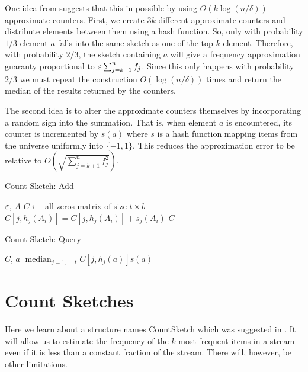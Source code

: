 One idea from \cite{Charikar02findingfrequent} suggests that this in possible by using $O(k \log(n/\delta))$ approximate counters.
First, we create $3k$ different approximate counters and distribute elements between them using a hash function.
So, only with probability $1/3$ element $a$ falls into the same sketch as one of the top $k$ element.
Therefore, with probability $2/3$, the sketch containing  $a$ will give a frequency  approximation guaranty proportional to $\varepsilon \sum_{j=k+1}^{n}f_j$. Since this only happens with probability $2/3$ we must repeat the construction $O(\log(n/\delta))$ times and return the median
of the results returned by the counters.

The second idea is to alter the approximate counters themselves by incorporating a random sign into the summation.
That is, when element $a$ is encountered, its counter is incremented by $s(a)$ where $s$
is a hash function mapping items from the universe uniformly into $\{-1,1\}$.
This reduces the approximation error to be relative to $O(\sqrt{\sum_{j=k+1}^{n}f^2_j})$.

\begin{algorithm}
\caption{Count Sketch: Add}
\label{alg:CountSketchAdd}
\begin{algorithmic}
 $\varepsilon$, $A$ 
\STATE $C \leftarrow$ all zeros matrix of size $t \times b$
		\STATE $C[j,h_j(A_i)] = C[j,h_j(A_i)] + s_j(A_i)$
	\ENDFOR
\ENDFOR
{} $C$ 
\end{algorithmic}
\end{algorithm}
\begin{algorithm}
\caption{Count Sketch: Query}
\label{alg:CountSketchAdd}
\begin{algorithmic}
 $C$, $a$
 $\operatorname{median}_{j =1,\ldots,t} C[j,h_j(a)]s(a)$ 
\end{algorithmic}
\end{algorithm}











\section*{Count Sketches}

Here we learn about a structure names CountSketch which was suggested in \cite{Charikar02findingfrequent}. 
It will allow us to estimate the frequency of the $k$ most frequent items in a stream even if it is less than a constant fraction of the stream.
There will, however, be other limitations.

